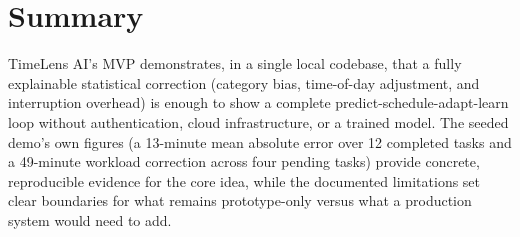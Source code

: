 \documentclass[11pt,a4paper]{article}
\begin{document}
\section{Summary}
TimeLens AI's MVP demonstrates, in a single local codebase, that a fully explainable statistical
correction (category bias, time-of-day adjustment, and interruption overhead) is enough to show
a complete predict-schedule-adapt-learn loop without authentication, cloud infrastructure, or a trained
model. The seeded demo's own figures (a 13-minute mean absolute error over 12 completed tasks and a
49-minute workload correction across four pending tasks) provide concrete, reproducible evidence for
the core idea, while the documented limitations set clear boundaries for what remains prototype-only
versus what a production system would need to add.
\end{document}
